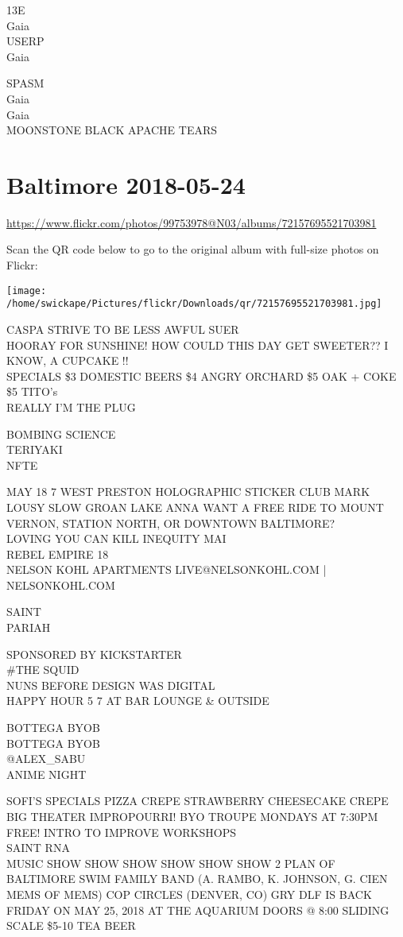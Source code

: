 \documentclass[10pt,letterpaper]{article}
\begin{document}
13E\\
Gaia\\
USERP\\
Gaia

SPASM\\
Gaia\\
Gaia\\
MOONSTONE BLACK APACHE TEARS


\section*{Baltimore 2018-05-24}

\url{https://www.flickr.com/photos/99753978@N03/albums/72157695521703981}

Scan the QR code below to go to the original album with full-size photos on Flickr:

\texttt{[image: /home/swickape/Pictures/flickr/Downloads/qr/72157695521703981.jpg]}


CASPA STRIVE TO BE LESS AWFUL SUER\\
HOORAY FOR SUNSHINE!  HOW COULD THIS DAY GET SWEETER??  I KNOW, A CUPCAKE !!\\
SPECIALS \$3 DOMESTIC BEERS \$4 ANGRY ORCHARD \$5 OAK + COKE \$5 TITO's\\
REALLY I'M THE PLUG

BOMBING SCIENCE\\
TERIYAKI\\
NFTE

MAY 18 7 WEST PRESTON HOLOGRAPHIC STICKER CLUB MARK LOUSY SLOW GROAN LAKE ANNA WANT A FREE RIDE TO MOUNT VERNON, STATION NORTH, OR DOWNTOWN BALTIMORE?\\
LOVING YOU CAN KILL INEQUITY MAI\\
REBEL EMPIRE 18\\
NELSON KOHL APARTMENTS LIVE@NELSONKOHL.COM | NELSONKOHL.COM

SAINT\\
PARIAH

SPONSORED BY KICKSTARTER\\
\#THE SQUID\\
NUNS BEFORE DESIGN WAS DIGITAL\\
HAPPY HOUR 5 7 AT BAR LOUNGE \& OUTSIDE

BOTTEGA BYOB\\
BOTTEGA BYOB\\
@ALEX\_SABU\\
ANIME NIGHT

SOFI'S SPECIALS PIZZA CREPE STRAWBERRY CHEESECAKE CREPE\\
BIG THEATER IMPROPOURRI! BYO TROUPE MONDAYS AT 7:30PM FREE! INTRO TO IMPROVE WORKSHOPS\\
SAINT RNA\\
MUSIC SHOW SHOW SHOW SHOW SHOW SHOW 2 PLAN OF BALTIMORE SWIM FAMILY BAND (A. RAMBO, K. JOHNSON, G. CIEN MEMS OF MEMS) COP CIRCLES (DENVER, CO) GRY DLF IS BACK FRIDAY ON MAY 25, 2018 AT THE AQUARIUM DOORS @ 8:00 SLIDING SCALE \$5{-}10 TEA BEER
\end{document}
